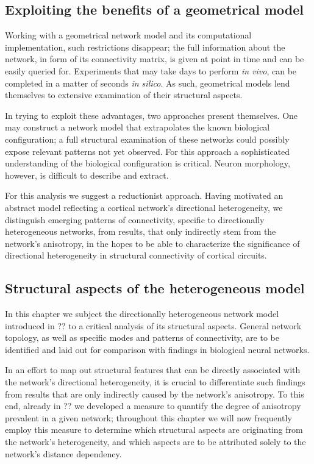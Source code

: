 \subsection*{Exploiting the benefits of a geometrical model}

Working with a geometrical network model and its computational
implementation, such restrictions disappear; the full information
about the network, in form of its connectivity matrix, is given at
point in time and can be easily queried for. Experiments that may take
days to perform \textit{in vivo}, can be completed in a matter of seconds \textit{in
silico}. As such, geometrical models lend themselves to extensive
examination of their structural aspects.

In trying to exploit these advantages, two approaches present
themselves. One may construct a network model that
extrapolates the known
biological configuration; a full structural examination of these
networks could possibly expose relevant patterns not yet observed. For
this approach a sophisticated understanding of the biological
configuration is critical. Neuron morphology, however, is difficult to
describe and extract.

For this analysis we suggest a reductionist approach. Having motivated
an abstract model reflecting a cortical network's directional
heterogeneity, we distinguish emerging patterns of connectivity,
specific to directionally heterogeneous networks, from results, that
only indirectly stem from the network's anisotropy, in the hopes to be
able to characterize the significance of directional heterogeneity in
structural connectivity of cortical circuits.


\subsection*{Structural aspects of the heterogeneous model}

In this chapter we subject the directionally heterogeneous network
model introduced in ?? to a critical analysis of its structural
aspects. General network topology, as well as specific modes and
patterns of connectivity, are to be identified and laid out for
comparison with findings in biological neural networks.

In an effort to map out structural features that can be directly
associated with the network's directional  heterogeneity, it is crucial to differentiate
such findings from results that are only indirectly caused by the
network's anisotropy. To this end, already in ?? we developed a
measure to quantify the degree of anisotropy prevalent in a given
network; throughout this chapter we will now frequently employ this
measure to determine which structural aspects are originating from the
network's heterogeneity, and which aspects are to be attributed solely
to the network's distance dependency.

